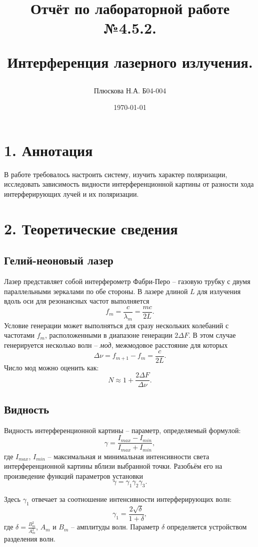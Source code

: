 \documentclass[a4paper,12pt]{report}
\title{Отчёт по лабораторной работе №4.5.2. 

Интерференция лазерного излучения.}
\author{Плюскова Н.А. Б04-004 }
\date{\today}
\begin{document}
\maketitle
\section*{1. Аннотация}
В работе требовалось настроить систему, изучить характер поляризации, исследовать зависимость видности интерференционной картины от разности хода интерферирующих лучей и их поляризации.

\section*{2. Теоретические сведения}
\subsection*{Гелий-неоновый лазер}
Лазер представляет собой интерферометр Фабри-Перо -- газовую трубку с двумя параллельными зеркалами по обе стороны. В лазере длиной $L$ для излучения вдоль оси для резонансных частот выполняется
\begin{equation}
f_m = \dfrac{c}{\lambda_m} = \dfrac{mc}{2L}.
\end{equation}
Условие генерации может выполняться для сразу нескольких колебаний с частотами $f_m$, расположенными в диапазоне генерации $2\Delta F$. В этом случае генерируется несколько волн -- \textit{мод}, межмодовое расстояние для которых
\begin{equation}
\Delta \nu = f_{m+1} - f_m = \dfrac{c}{2L}.
\end{equation}
Число мод можно оценить как: 
\begin{equation}
N \approx 1 + \dfrac{2\Delta F}{\Delta \nu}.
\end{equation}
\subsection*{Видность}
Видность интерференционной картины -- параметр, определяемый формулой:
\begin{equation}
\gamma = \dfrac{I_{max} - I_{min}}{I_{max} + I_{min}},
\end{equation}
где $I_{max}$, $I_{min}$ -- максимальная и минимальная интенсивности света интерференционной картины вблизи выбранной точки. Разобьём его на произведение функций параметров установки
$$\gamma = \gamma_1 \gamma_2 \gamma_3.$$

Здесь $\gamma_1$ отвечает за соотношение интенсивности интерферирующих волн:
\begin{equation}
\gamma_1 = \dfrac{2\sqrt{\delta}}{1+\delta},
\end{equation}
где $\delta = \frac{B_m^2}{A_m^2}$, $A_m$ и $B_m$ -- амплитуды волн. Параметр $\delta$ определяется устройством разделения волн.
\end{document}
